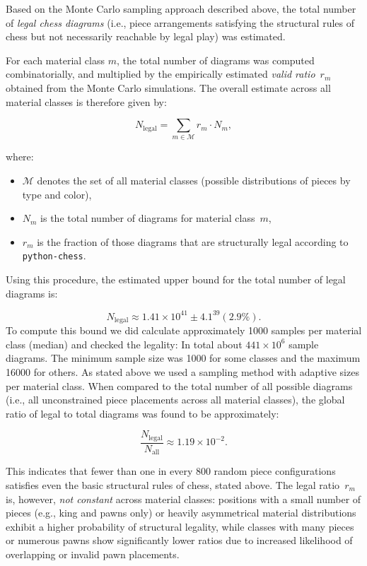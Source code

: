 \documentclass[12pt]{article}
\begin{document}
Based on the Monte Carlo sampling approach described above, the total number of \emph{legal chess diagrams} (i.e., piece arrangements satisfying the structural rules of chess but not necessarily reachable by legal play) was estimated.

For each material class $m$, the total number of diagrams was computed combinatorially, and multiplied by the empirically estimated \emph{valid ratio}~$r_m$ obtained from the Monte Carlo simulations.  
The overall estimate across all material classes is therefore given by:

\[
N_{\text{legal}} = \sum_{m \in \mathcal{M}} r_m \cdot N_m,
\]

where:
\begin{itemize}
    \item $\mathcal{M}$ denotes the set of all material classes (possible distributions of pieces by type and color),
    \item $N_m$ is the total number of diagrams for material class~$m$,
    \item $r_m$ is the fraction of those diagrams that are structurally legal according to \texttt{python-chess}.
\end{itemize}

Using this procedure, the estimated upper bound for the total number of legal diagrams is:

\[
N_{\text{legal}} \approx 1.41 \times 10^{41}\pm4.1^{39} (2.9\%).
\]
To compute this bound we did calculate approximately 1000 samples per material class (median) and checked the legality: In total about $441\times 10^{6}$ sample diagrams. The minimum sample size was 1000 for some classes and the maximum 16000 for others. As stated above we used a sampling method with adaptive sizes per material class.
\noindent
When compared to the total number of all possible diagrams (i.e., all unconstrained piece placements across all material classes), the global ratio of legal to total diagrams was found to be approximately:

\[
\frac{N_{\text{legal}}}{N_{\text{all}}} \approx 1.19\times 10^{-2}.
\]

This indicates that fewer than one in every 800 random piece configurations satisfies even the basic structural rules of chess, stated above.
The legal ratio~$r_m$ is, however, \emph{not constant} across material classes: positions with a small number of pieces (e.g., king and pawns only) or heavily asymmetrical material distributions exhibit a higher probability of structural legality, while classes with many pieces or numerous pawns show significantly lower ratios due to increased likelihood of overlapping or invalid pawn placements.
\end{document}
